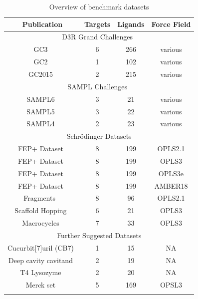 \documentclass[9pt,bestpractices]{livecoms}
\begin{document}
\begin{table}
\caption{Overview of benchmark datasets}
\begin{tabular}{cccc}
\textbf{Publication} & \textbf{Targets} & \textbf{Ligands} & \textbf{Force Field} \\
\hline
\multicolumn{4}{|c|}{D3R Grand Challenges~\cite{D3R}} \\
\hline
GC3~\cite{gaieb2019d3r} & 6 & 266 & various \\
GC2~\cite{gaieb2018d3r} & 1 & 102 & various \\
GC2015~\cite{gathiaka2016d3r} & 2 & 215 & various \\
\hline
\multicolumn{4}{|c|}{SAMPL Challenges~\cite{SAMPL}} \\
\hline
SAMPL6~\cite{rizzi2018overview} & 3 & 21 & various \\
SAMPL5~\cite{yin2017overview} & 3 & 22 & various \\
SAMPL4~\cite{muddana2014sampl4} & 2 & 23 & various \\
\hline
\multicolumn{4}{|c|}{Schrödinger Datasets} \\
\hline
FEP+ Dataset~\cite{wang2015accurate} & 8 & 199 & OPLS2.1 \\
FEP+ Dataset~\cite{harder2016opls3} & 8 & 199 & OPLS3 \\
FEP+ Dataset~\cite{roos2019opls3e} & 8 & 199 & OPLS3e \\
FEP+ Dataset~\cite{song2019using} & 8 & 199 & AMBER18 \\
Fragments ~\cite{steinbrecher2015accurate} & 8 & 96 & OPLS2.1 \\
Scaffold Hopping~\cite{wang2017accurate} & 6 & 21 & OPLS3 \\
Macrocycles~\cite{yu2017accurate} & 7 & 33 & OPLS3 \\
\hline
\multicolumn{4}{|c|}{Further Suggested Datasets} \\
\hline
Cucurbit[7]uril (CB7)~\cite{mobley2017predicting} & 1 & 15 & NA \\
Deep cavity cavitand~\cite{mobley2017predicting} & 2 & 19 & NA \\
T4 Lysozyme~\cite{mobley2017predicting} & 2 & 20 & NA \\
Merck  set~\cite{MCompChem2019Sep} & 5 & 169 & OPSL3 \\

\hline
\label{tab:benchmarks}
\end{tabular}
\end{table}

\clearpage
\end{document}
